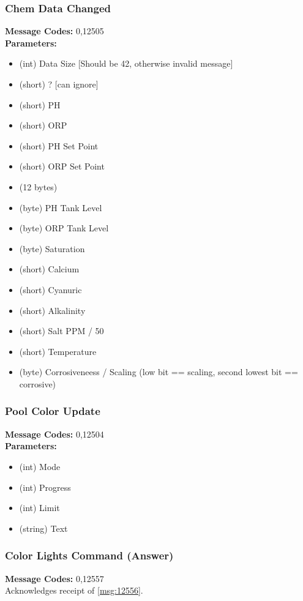 \documentclass[11pt]{article}
\begin{document}
\subsubsection{Chem Data Changed}
\label{msg:12505}
{\bf Message Codes: } 0,12505\\
{\bf Parameters: }
\small
\begin{itemize}
\item (int) Data Size [Should be 42, otherwise invalid message]
\item (short) ? [can ignore]
\item (short) PH
\item (short) ORP
\item (short) PH Set Point
\item (short) ORP Set Point
\item (12 bytes)
\item (byte) PH Tank Level
\item (byte) ORP Tank Level
\item (byte) Saturation
\item (short) Calcium
\item (short) Cyanuric
\item (short) Alkalinity
\item (short) Salt PPM / 50
\item (short) Temperature
\item (byte) Corrosiveneess / Scaling (low bit == scaling, second lowest bit == corrosive)
\end{itemize}
\normalsize

\subsubsection{Pool Color Update}
\label{msg:12504}
{\bf Message Codes: } 0,12504\\
{\bf Parameters: }
\small
\begin{itemize}
\item {\color{red} (int) Mode}
\item {\color{red} (int) Progress}
\item {\color{red} (int) Limit}
\item {\color{red} (string) Text}
\end{itemize}
\normalsize

\subsubsection{Color Lights Command (Answer)}
\label{msg:12557}
{\bf Message Codes: } 0,12557\\
Acknowledges receipt of \ref{msg:12556}.
\end{document}
